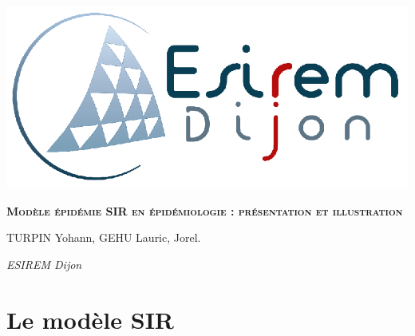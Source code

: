 \documentclass[11pt]{report}
\newcommand\blankpage{%
    \null
    \thispagestyle{empty}%
    \addtocounter{page}{-1}%
    \newpage}
\newcommand{\titulo}{\color{blue}Modèle épidémie SIR en épidémiologie : présentation et illustration}
\newcommand{\autor}{TURPIN Yohann, GEHU Lauric, Jorel.}
\newcommand{\fecha}{ESIREM Dijon}
\begin{document}
    \cfoot{\thepage}
    
    \begin{titlepage}
        \reversemarginpar{}
        
        {\centering
            \vspace{3cm} %
            \hspace{5cm} \includegraphics[width=.4\textwidth]{figs/Logo_Esirem.png} %
            \par\vspace{5cm}
            {\scshape\huge\textbf{\hspace{2cm}\titulo}} \par\vspace{6cm}
            
            {\LARGE
            \begin{flushright}
                    \item \autor 
                    \item \textit{\fecha}
            \end{flushright}
            }
        }
    \end{titlepage}

    \afterpage{\blankpage}
    
\begingroup
    \tableofcontents
\endgroup    
    \newpage
    \chapter{Le modèle SIR}
\end{document}
